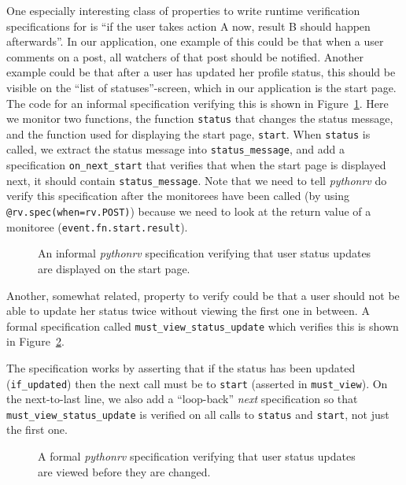 One especially interesting class of properties to write runtime verification
specifications for is ``if the user takes action A now, result B should happen
afterwards''. In our application, one example of this could be that when a user
comments on a post, all watchers of that post should be notified. Another
example could be that after a user has updated her profile status, this should
be visible on the ``list of statuses''-screen, which in our application is the
start page. The code for an informal specification verifying this is shown in
Figure~\ref{figure-app-status-update-displayed-informal}. Here we monitor two
functions, the function \texttt{status} that changes the status message, and
the function used for displaying the start page, \texttt{start}. When
\texttt{status} is called, we extract the status message into
\texttt{status\_message}, and add a specification \texttt{on\_next\_start} that
verifies that when the start page is displayed next, it should contain
\texttt{status\_message}. Note that we need to tell \textit{pythonrv} do verify
this specification after the monitorees have been called (by using
\texttt{@rv.spec(when=rv.POST)}) because we need to look at the return value of
a monitoree (\texttt{event.fn.start.result}).

\begin{figure}[h!]
	\begin{center}
	\begin{minipage}{0.9\textwidth}
	
	\end{minipage}
	\end{center}

  \caption{An informal \textit{pythonrv} specification verifying that user
    status updates are displayed on the start page.}
	\label{figure-app-status-update-displayed-informal}
\end{figure}

Another, somewhat related, property to verify could be that a user should not
be able to update her status twice without viewing the first one in between. A
formal specification called \texttt{must\_view\_status\_update} which verifies
this is shown in Figure~\ref{figure-app-status-update-viewed-formal}.

The specification works by asserting that if the status has been updated
(\texttt{if\_updated}) then the next call must be to \texttt{start}
(asserted in \texttt{must\_view}). On the next-to-last line, we also add a
``loop-back'' \textit{next} specification so that
\texttt{must\_view\_status\_update} is verified on all calls to \texttt{status}
and \texttt{start}, not just the first one.

\begin{figure}[h!]
	\begin{center}
	\begin{minipage}{0.9\textwidth}
	
	\end{minipage}
	\end{center}

  \caption{A formal \textit{pythonrv} specification verifying that user status
    updates are viewed before they are changed.}
	\label{figure-app-status-update-viewed-formal}
\end{figure}
